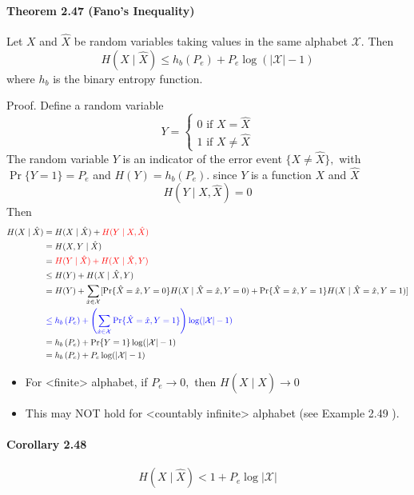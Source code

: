 \documentclass[8pt]{article}
\begin{document}
\begin{tcolorbox}
\paragraph{Theorem 2.47 (Fano's Inequality)} Let $X$ and $\hat{X}$ be random variables taking values in the same alphabet $\mathcal{X} .$ Then
$$
H(X \mid \hat{X}) \leq h_{b}\left(P_{e}\right)+P_{e} \log (|\mathcal{X}|-1)
$$
where $h_{b}$ is the binary entropy function.
\end{tcolorbox}
Proof. Define a random variable
$$
Y=\left\{\begin{array}{l}
0 \text { if } X=\hat{X} \\
1 \text { if } X \neq \hat{X}
\end{array}\right.
$$
The random variable $Y$ is an indicator of the error event $\{X \neq \hat{X}\},$ with $\operatorname{Pr}\{Y=1\}=P_{e}$ and $H(Y)=h_{b}\left(P_{e}\right) .$ since $Y$ is a function $X$ and $\hat{X}$
$$
H(Y \mid X, \hat{X})=0
$$
Then
$$
\begin{aligned}
H(X \mid \hat{X}) &=H(X \mid \hat{X})+ \color{red} H(Y \mid X, \hat{X}) \\
&=H(X, Y \mid \hat{X}) \\
&= \color{red} H(Y \mid \hat{X})+H(X \mid \hat{X}, Y) \\
&\leq H(Y)+H(X \mid \hat{X}, Y) \\
&=H(Y)+\sum_{\hat{x} \in \mathcal{X}}[\operatorname{Pr}\{\hat{X}=\hat{x}, Y=0\} H(X \mid \hat{X}=\hat{x}, Y=0) +\operatorname{Pr}\{\hat{X}=\hat{x}, Y=1\} H(X \mid \hat{X}=\hat{x}, Y=1)] \\
& \color{blue} \leq h_{b}\left(P_{e}\right)+\left(\sum_{\dot{x} \in \mathcal{X}} \operatorname{Pr}\{\hat{X}=\hat{x}, Y=1\}\right) \log (|\mathcal{X}|-1) \\
& = h_{b}\left(P_{e}\right)+\operatorname{Pr}\{Y=1\} \log (|\mathcal{X}|-1) \\
& =h_{b}\left(P_{e}\right)+P_{e} \log (|\mathcal{X}|-1)
\end{aligned}
$$
\begin{itemize}
	\item For <finite> alphabet, if $P_{e} \rightarrow 0,$ then $H(X \mid \hat{X}) \rightarrow 0$
	\item This may NOT hold for <countably infinite> alphabet (see Example 2.49 ).
\end{itemize}
\begin{tcolorbox}
\paragraph{Corollary 2.48} $$H(X \mid \hat{X})<1+P_{e} \log |\mathcal{X}|$$
\end{tcolorbox}
\end{document}
